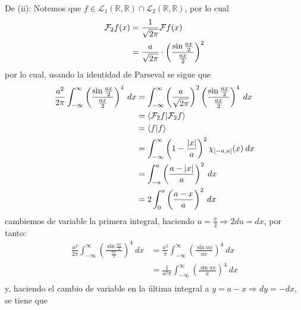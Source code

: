 \documentclass[12pt]{report}
\newcounter{it}
\theoremstyle{largebreak}
\newcommand\abs[1]{\ensuremath{\left|#1\right|}}
\newcommand\pint[2]{\ensuremath{\langle#1| #2\rangle}}
\newcommand{\fou}[1]{\ensuremath{\mathcal{F}#1}}
\begin{document}
\begin{sol}
        De (ii): Notemos que $f\in\mathcal{L}_1(\mathbb{R},\mathbb{R})\cap\mathcal{L}_2(\mathbb{R},\mathbb{R})$, por lo cual
        \begin{equation*}
            \begin{split}
                \fou_2{f}(x)&=\frac{1}{\sqrt{2\pi}}\fou{f}(x)\\
                &=\frac{a}{\sqrt{2\pi}}\cdot\left(\frac{\sin\frac{ax}{2}}{\frac{ax}{2}}\right)^2\\
            \end{split}
        \end{equation*}
        por lo cual, usando la identidad de Parseval se sigue que
        \begin{equation*}
            \begin{split}
                \frac{a^2}{2\pi}\int_{ -\infty}^{\infty}\left(\frac{\sin\frac{ax}{2}}{\frac{ax}{2}} \right)^4\:dx&=\int_{ -\infty}^{\infty}\left(\frac{a}{\sqrt{2\pi}}\right)^2 \left(\frac{\sin\frac{ax}{2}}{\frac{ax}{2}} \right)^4\:dx\\
                &=\pint{\fou_2{f}}{\fou_2{f}}\\
                &=\pint{f}{f}\\
                &=\int_{-\infty}^\infty\left(1-\frac{\abs{x}}{a}\right)^2\chi_{[-a,a]}(x)\:dx\\
                &=\int_{-a}^a\left(\frac{a-\abs{x}}{a}\right)^2\:dx\\
                &=2\int_{0}^a\left(\frac{a-x}{a}\right)^2\:dx\\
            \end{split}
        \end{equation*}
        cambiemos de variable la primera integral, haciendo $u=\frac{x}{2}\Rightarrow 2du=dx$, por tanto:
        \begin{equation*}
            \begin{split}
                \frac{a^2}{2\pi}\int_{ -\infty}^{\infty}\left(\frac{\sin\frac{ax}{2}}{\frac{ax}{2}} \right)^4\:dx&=\frac{a^2}{\pi}\int_{ -\infty}^{\infty}\left(\frac{\sin ax}{ax}\right)^4\:dx\\
                &=\frac{1}{a^2\pi}\int_{ -\infty}^{\infty}\left(\frac{\sin ax}{x}\right)^4\:dx\\
            \end{split}
        \end{equation*}
        y, haciendo el cambio de variable en la última integral a $y=a-x\Rightarrow dy=-dx$, se tiene que 
        \begin{equation*}

\end{equation*}
\end{sol}
\end{document}
